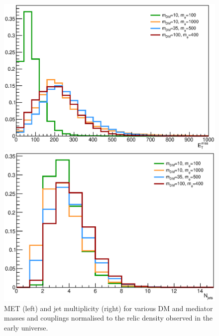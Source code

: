 \begin{figure}[h!]
    \begin{minipage}{0.49\textwidth}
      \centering 
      \includegraphics[scale=0.32]{figures/bFDM/bfdm_relic/missing_et.eps}
    \end{minipage}
    \hfill
    \begin{minipage}{0.49\textwidth}
      \centering 
      \includegraphics[scale=0.32]{figures/bFDM/bfdm_relic/Njets.eps}
    \end{minipage}
    \caption{MET (left) and jet multiplicity (right) for various DM and mediator masses and couplings normalised to the relic density observed in the early universe. \label{fig:relic}}
\end{figure}


